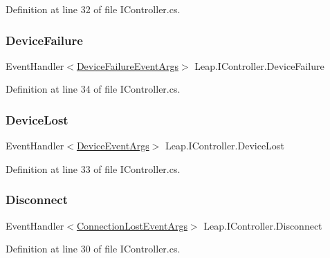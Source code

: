 Definition at line 32 of file I\+Controller.\+cs.

\mbox{\label{interface_leap_1_1_i_controller_a6ea9036d16ee4555db83da6a41ce3802}} 
\subsubsection{\texorpdfstring{DeviceFailure}{DeviceFailure}}
{\footnotesize\ttfamily Event\+Handler$<$\mbox{\hyperlink{class_leap_1_1_device_failure_event_args}{Device\+Failure\+Event\+Args}}$>$ Leap.\+I\+Controller.\+Device\+Failure}



Definition at line 34 of file I\+Controller.\+cs.

\mbox{\label{interface_leap_1_1_i_controller_acebdfe34ac0a49f4fc045321cdad1a8f}} 
\subsubsection{\texorpdfstring{DeviceLost}{DeviceLost}}
{\footnotesize\ttfamily Event\+Handler$<$\mbox{\hyperlink{class_leap_1_1_device_event_args}{Device\+Event\+Args}}$>$ Leap.\+I\+Controller.\+Device\+Lost}



Definition at line 33 of file I\+Controller.\+cs.

\mbox{\label{interface_leap_1_1_i_controller_a628fffe087c34d18582c2ed6f6a47ce8}} 
\subsubsection{\texorpdfstring{Disconnect}{Disconnect}}
{\footnotesize\ttfamily Event\+Handler$<$\mbox{\hyperlink{class_leap_1_1_connection_lost_event_args}{Connection\+Lost\+Event\+Args}}$>$ Leap.\+I\+Controller.\+Disconnect}



Definition at line 30 of file I\+Controller.\+cs.

